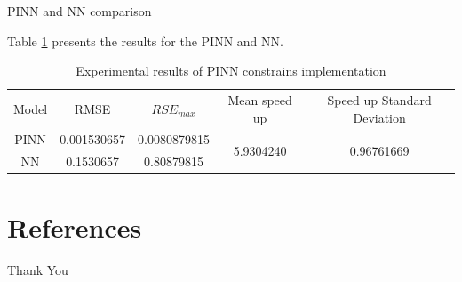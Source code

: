 \documentclass[serif,8pt, aspectratio=169]{beamer}
\begin{document}
\begin{frame}[fragile]{PINN and NN comparison}

    Table \ref{tab:results} presents the results for the PINN and NN.
    
        \begin{table}[htb!]
        \centering
        \caption{Experimental results of PINN constrains implementation}
        \label{tab:results}
        \begin{tabular}{ccccc}
        \cline{1-5}
        Model & RMSE        & $RSE_{max}$ & Mean speed up              & Speed up Standard Deviation \\ \cline{1-5}
        PINN  & 0.001530657 & 0.0080879815   & \multirow{2}{*}{5.9304240} & \multirow{2}{*}{0.96761669} \\
        NN    & 0.1530657   & 0.80879815     &                            &                            
        \end{tabular}
        \end{table}

\end{frame}

\section{References}

\begin{frame}[allowframebreaks]
    
    
\end{frame}


\begin{frame}
    \begin{center}
        {\Huge\calligra Thank You}
    \end{center}
\end{frame}
\end{document}
